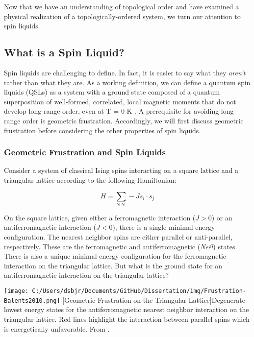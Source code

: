Now that we have an understanding of topological order and have examined a physical realization of a topologically-ordered system, we turn our attention to spin liquids.

\subsection{What is a Spin Liquid?}

Spin liquids are challenging to define. In fact, it is easier to say what they \textit{aren't} rather than what they are. As a working definition, we can define a quantum spin liquids (QSLs) as a system with a ground state composed of a quantum superposition of well-formed, correlated, local magnetic moments that do not develop long-range order, even at T = 0 K \cite{Balents2010}. A prerequisite for avoiding long range order is geometric frustration. Accordingly, we will first discuss geometric frustration before considering the other properties of spin liquids.

\subsubsection{Geometric Frustration and Spin Liquids}

Consider a system of classical Ising spins interacting on a square lattice and a triangular lattice according to the following Hamiltonian: 

\begin{equation}
H = \sum_{\text{N.N.}} -J s_{i} \cdot s_{j}
\end{equation}

On the square lattice, given either a ferromagnetic interaction ($J > 0$) or an antiferromagnetic interaction ($J < 0$), there is a single minimal energy configuration. The nearest neighbor spins are either parallel or anti-parallel, respectively. These are the ferromagnetic and antiferromagnetic (\textit{Ne{\'e}l}) states. There is also a unique minimal energy configuration for the ferromagnetic interaction on the triangular lattice. But what is the ground state for an antiferromagnetic interaction on the triangular lattice?

\begin{centering}
\texttt{[image: C:/Users/dsbjr/Documents/GitHub/Dissertation/img/Frustration-Balents2010.png]}
  \captionsetup{width=0.75\textwidth}
  [Geometric Frustration on the Triangular Lattice]{Degenerate lowest energy states for the antiferromagnetic nearest neighbor interaction on the triangular lattice. Red lines highlight the interaction between parallel spins which is energetically unfavorable. From \cite{Balents2010}.}
  \label{fig:Frustration1}
\end{centering}

